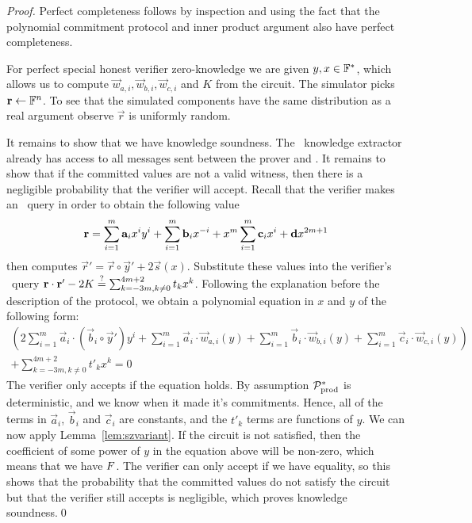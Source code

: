 \begin{proof}\label{ap:proofAC}
Perfect completeness follows by inspection and using the fact that the polynomial commitment protocol  and inner product argument also have perfect completeness.

For perfect special honest verifier zero-knowledge we are given $y,x\in \F^*$, which allows us to compute $\vec{w}_{a,i},\vec{w}_{b,i},\vec{w}_{c,i}$ and $K$ from the circuit. The simulator picks $\vec{r}\gets \F^n$. To see that the simulated components have the same distribution as a real argument observe $\vec{r}$ is uniformly random.

It remains to show that we have knowledge soundness. The \ILC\ knowledge extractor already has access to all messages sent between the prover and \ILC. It remains to show that if the committed values are not a valid witness, then there is a negligible probability that the verifier will accept.
Recall that the verifier makes an \ILCopen\ query in order to obtain the following value
\[
\vec{r} =\sum_{i=1}^m\vec{a}_{i}x^{i} y^i+\sum_{i=1}^m\vec{b}_{i} x^{-i}+x^m \sum_{i=1}^m\vec{c}_{i} x^{i}+\vec{d}x^{2m+1}\\
\]
then computes $\vec{r}'=\vec{r}\circ \vec{y}' +2\vec{s}(x)$. Substitute these values into the verifier's \ILCcheck\ query $\vec{r}\cdot \vec{r}'-2K \vereq \sum_{k=-3m,k \neq 0}^{4m+2}t_k x^{k}$.
Following the explanation before the description of the protocol, we obtain a polynomial equation in $x$ and $y$ of the following form:
\begin{align*}
\left(2 \sum_{i=1}^m  \vec{a}_i  \cdot (\vec{b}_i \circ \vec{y}') y^i + \sum_{i=1}^m \vec{a}_i  \cdot \vec{w}_{a,i}(y)  +\sum_{i=1}^m \vec{b}_i \cdot \vec{w}_{b,i}(y)   +\sum_{i=1}^m \vec{c}_i \cdot \vec{w}_{c,i}(y)\right) \\
+ \sum_{k=-3m,k \neq 0}^{4m+2}t'_k x^{k} = 0
\end{align*}
The verifier only accepts if the equation holds. By assumption $\PoProdMal$ is deterministic, and we know when it made it's commitments. Hence, all of the terms in $\vec{a}_i$, $\vec{b}_i$ and $\vec{c}_i$ are constants, and the $t'_k$ terms are functions of $y$. We can now apply Lemma~\ref{lem:szvariant}. If the circuit is not satisfied, then the coefficient of some power of $y$ in the equation above will be non-zero, which means that we have $\eventsz$. The verifier can only accept if we have equality, so this shows that the probability that the committed values do not satisfy the circuit but that the verifier still accepts is negligible, which proves knowledge soundness.\qed
\end{proof}


